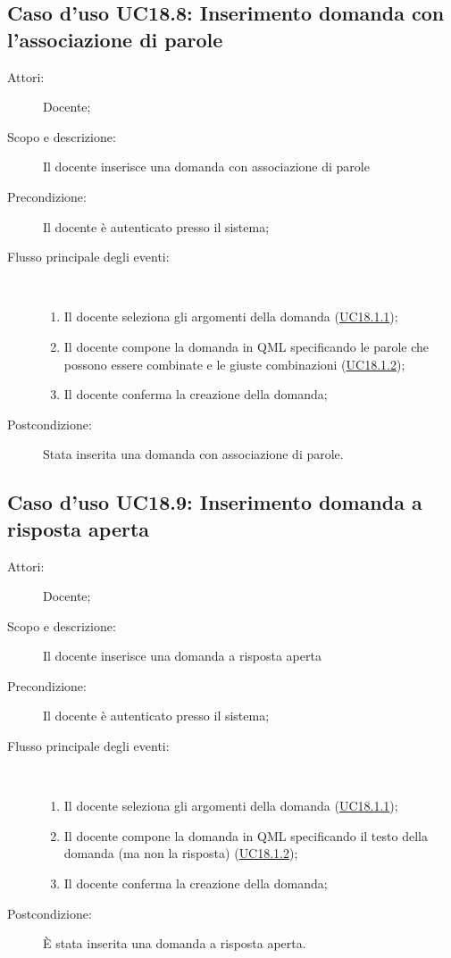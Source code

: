 \subsection{Caso d'uso UC18.8: Inserimento domanda con l'associazione di parole}\begin{description}
\item[Attori:] Docente;
\item[Scopo e descrizione:] Il docente inserisce una domanda con associazione di parole
      \item[Precondizione:] Il docente è autenticato presso il sistema;

        \item[Flusso principale degli eventi:] \ 
 \begin{enumerate}
          \item Il docente seleziona gli argomenti della domanda (\hyperlink{UC18.1.1}{UC18.1.1});
          \item Il docente compone la domanda in QML specificando le parole che possono essere combinate e le giuste combinazioni (\hyperlink{UC18.1.2}{UC18.1.2});
          \item Il docente conferma la creazione della domanda;

      \end{enumerate}
    \item[Postcondizione:] Stata inserita una domanda con associazione di parole.
  \end{description}
\hypertarget{UC18.9}{}
\subsection{Caso d'uso UC18.9: Inserimento domanda a risposta aperta}\begin{description}
\item[Attori:] Docente;
\item[Scopo e descrizione:] Il docente inserisce una domanda a risposta aperta
      \item[Precondizione:] Il docente è autenticato presso il sistema;

        \item[Flusso principale degli eventi:] \ 
 \begin{enumerate}
          \item Il docente seleziona gli argomenti della domanda (\hyperlink{UC18.1.1}{UC18.1.1});
          \item Il docente compone la domanda in QML specificando il testo della domanda (ma non la risposta) (\hyperlink{UC18.1.2}{UC18.1.2});
          \item Il docente conferma la creazione della domanda;

      \end{enumerate}
    \item[Postcondizione:] È stata inserita una domanda a risposta aperta.
  \end{description}
\hypertarget{UC18.10}{}
